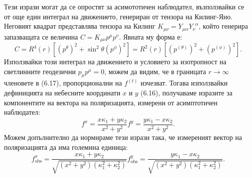 Тези изрази могат да се опростят за асимототичен наблюдател, възползвайки се от още един интеграл на движението, генериран от тензора на Килинг-Яно. Неговият квадрат представлява тензора на Килинг $K_{\mu\nu} = Y_{\mu\alpha}Y_{\nu}^{\,\,\,\alpha}$, който генерира запазващата се величина $C = K_{\mu\nu}p^\mu p^\nu$. Явната му форма е:
\begin{equation}
	C =  R^4(r)\left[\left(p^{\theta}\right)^2 + \sin^2\theta \left(p^{\phi}\right)^2\right] = R^2(r)\left[\left(p^{(\theta)}\right)^2 + \left(p^{(\phi)}\right)^2\right].
\end{equation}
Използвайки този интеграл на движението и условието за изотропност на светлинните геодезични $p_\mu p^\mu = 0$, можем да видим, че в границата $r\rightarrow\infty$ членовете в (6.17), пропорционални на $f^{(t)}$ изчезват. Тогава използвайки дефиницията на небесните координати $x$ и $y$ (6.16), получаваме изразите за компонентите на вектора на поляризацията, измерени от асимптотичен наблюдател:
\begin{subequations}
	\begin{equation}
		f^x = \frac{x\kappa_1 + y\kappa_2}{x^2 + y^2}
	\end{equation}
	\begin{equation}
		f^y = \frac{y \kappa_1 - x\kappa_2}{x^2 + y^2}.
	\end{equation}
\end{subequations}
Можем допълнително да нормираме тези изрази така, че измереният вектор на поляризацията да има големина единица:
\begin{subequations}
	\begin{equation}
		f^x_\text{obs} = \frac{x\kappa_1 + y\kappa_2}{\sqrt{(x^2 + y^2)(\kappa_1^2 + \kappa_2^2)}}
	\end{equation}
	\begin{equation}
		f^y_\text{obs} = \frac{y \kappa_1 - x\kappa_2}{\sqrt{(x^2 + y^2)(\kappa_1^2 + \kappa_2^2)}}.
	\end{equation}
\end{subequations}

